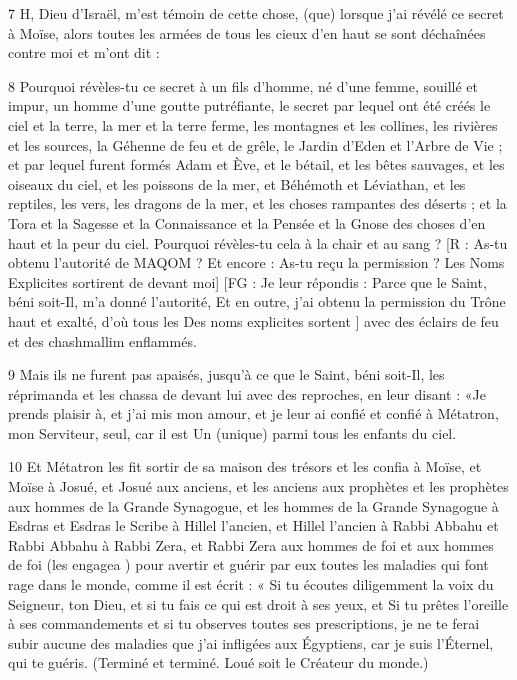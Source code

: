 \par 7 H, Dieu d'Israël, m'est témoin de cette chose, (que) lorsque j'ai révélé ce secret à Moïse, alors toutes les armées de tous les cieux d'en haut se sont déchaînées contre moi et m'ont dit :

\par 8 Pourquoi révèles-tu ce secret à un fils d'homme, né d'une femme, souillé et impur, un homme d'une goutte putréfiante, le secret par lequel ont été créés le ciel et la terre, la mer et la terre ferme, les montagnes et les collines, les rivières et les sources, la Géhenne de feu et de grêle, le Jardin d'Eden et l'Arbre de Vie ; et par lequel furent formés Adam et Ève, et le bétail, et les bêtes sauvages, et les oiseaux du ciel, et les poissons de la mer, et Béhémoth et Léviathan, et les reptiles, les vers, les dragons de la mer, et les choses rampantes des déserts ; et la Tora et la Sagesse et la Connaissance et la Pensée et la Gnose des choses d'en haut et la peur du ciel. Pourquoi révèles-tu cela à la chair et au sang ? [R : As-tu obtenu l’autorité de MAQOM ? Et encore : As-tu reçu la permission ? Les Noms Explicites sortirent de devant moi] [FG : Je leur répondis : Parce que le Saint, béni soit-Il, m'a donné l'autorité, Et en outre, j'ai obtenu la permission du Trône haut et exalté, d'où tous les Des noms explicites sortent ] avec des éclairs de feu et des chashmallim enflammés.

\par 9 Mais ils ne furent pas apaisés, jusqu'à ce que le Saint, béni soit-Il, les réprimanda et les chassa de devant lui avec des reproches, en leur disant : «Je prends plaisir à, et j'ai mis mon amour, et je leur ai confié et confié à Métatron, mon Serviteur, seul, car il est Un (unique) parmi tous les enfants du ciel.

\par 10 Et Métatron les fit sortir de sa maison des trésors et les confia à Moïse, et Moïse à Josué, et Josué aux anciens, et les anciens aux prophètes et les prophètes aux hommes de la Grande Synagogue, et les hommes de la Grande Synagogue à Esdras et Esdras le Scribe à Hillel l'ancien, et Hillel l'ancien à Rabbi Abbahu et Rabbi Abbahu à Rabbi Zera, et Rabbi Zera aux hommes de foi et aux hommes de foi (les engagea ) pour avertir et guérir par eux toutes les maladies qui font rage dans le monde, comme il est écrit : « Si tu écoutes diligemment la voix du Seigneur, ton Dieu, et si tu fais ce qui est droit à ses yeux, et Si tu prêtes l'oreille à ses commandements et si tu observes toutes ses prescriptions, je ne te ferai subir aucune des maladies que j'ai infligées aux Égyptiens, car je suis l'Éternel, qui te guéris. (Terminé et terminé. Loué soit le Créateur du monde.)




